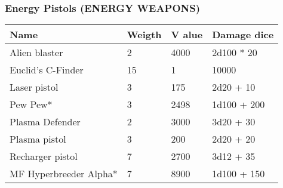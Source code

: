 
\subsubsection{Energy Pistols (ENERGY WEAPONS)}
\begin{longtable}{|p{4cm}|p{1.5cm}|p{1.5cm}|p{9cm}|}
\hline
\bfseries Name & \bfseries Weigth & \bfseries V alue & \bfseries Damage dice \\
\hline
\endhead
Alien blaster  & 2 & 4000 & 2d100 * 20 \\
Euclid's C-Finder  & 15 & 1 & 10000 \\
Laser pistol & 3 & 175 & 2d20 +  10 \\
Pew Pew*  & 3 & 2498 & 1d100 + 200 \\
Plasma Defender & 2 & 3000 & 3d20 + 30 \\
Plasma pistol & 3 & 200 & 2d20 + 20 \\
Recharger pistol  & 7 & 2700 & 3d12 + 35 \\
MF Hyperbreeder Alpha*  & 7 & 8900 & 1d100 + 150 \\
\hline
\end{longtable}
